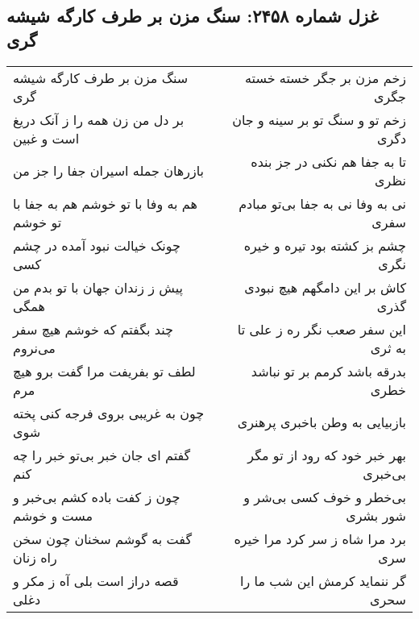 \begin{center}
\section*{غزل شماره ۲۴۵۸: سنگ مزن بر طرف کارگه شیشه گری}
\label{sec:2458}
\begin{longtable}{l p{0.5cm} r}
سنگ مزن بر طرف کارگه شیشه گری
&&
زخم مزن بر جگر خسته خسته جگری
\\
بر دل من زن همه را ز آنک دریغ است و غبین
&&
زخم تو و سنگ تو بر سینه و جان دگری
\\
بازرهان جمله اسیران جفا را جز من
&&
تا به جفا هم نکنی در جز بنده نظری
\\
هم به وفا با تو خوشم هم به جفا با تو خوشم
&&
نی به وفا نی به جفا بی‌تو مبادم سفری
\\
چونک خیالت نبود آمده در چشم کسی
&&
چشم بز کشته بود تیره و خیره نگری
\\
پیش ز زندان جهان با تو بدم من همگی
&&
کاش بر این دامگهم هیچ نبودی گذری
\\
چند بگفتم که خوشم هیچ سفر می‌نروم
&&
این سفر صعب نگر ره ز علی تا به ثری
\\
لطف تو بفریفت مرا گفت برو هیچ مرم
&&
بدرقه باشد کرمم بر تو نباشد خطری
\\
چون به غریبی بروی فرجه کنی پخته شوی
&&
بازبیایی به وطن باخبری پرهنری
\\
گفتم ای جان خبر بی‌تو خبر را چه کنم
&&
بهر خبر خود که رود از تو مگر بی‌خبری
\\
چون ز کفت باده کشم بی‌خبر و مست و خوشم
&&
بی‌خطر و خوف کسی بی‌شر و شور بشری
\\
گفت به گوشم سخنان چون سخن راه زنان
&&
برد مرا شاه ز سر کرد مرا خیره سری
\\
قصه دراز است بلی آه ز مکر و دغلی
&&
گر ننماید کرمش این شب ما را سحری
\\
\end{longtable}
\end{center}
